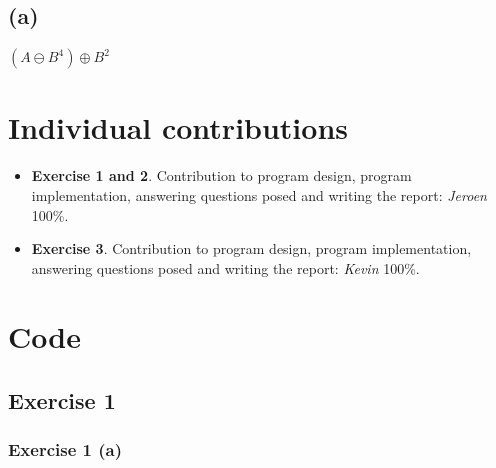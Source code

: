 \documentclass{article}
\begin{document}
\subsection*{(a)} $(A \ominus B^4) \oplus B^2$

\section*{Individual contributions}
\begin{itemize}
    \item \textbf{Exercise 1 and 2}. Contribution to program design, program implementation, answering questions posed and writing the report: \textit{Jeroen} 100\%.
    \item \textbf{Exercise 3}. Contribution to program design, program implementation, answering questions posed and writing the report: \textit{Kevin} 100\%.
\end{itemize}


\typeout{}


\newpage
\appendix
\section{Code}
\subsection{Exercise 1}
\subsubsection{Exercise 1 (a)}





\end{document}
